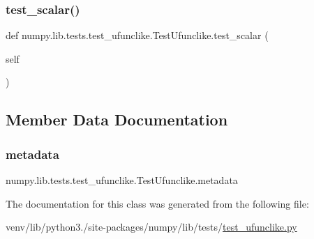 \subsubsection{\texorpdfstring{test\+\_\+scalar()}{test\_scalar()}}
{\footnotesize\ttfamily def numpy.\+lib.\+tests.\+test\+\_\+ufunclike.\+Test\+Ufunclike.\+test\+\_\+scalar (\begin{DoxyParamCaption}\item[{}]{self }\end{DoxyParamCaption})}



\subsection{Member Data Documentation}
\mbox{\label{classnumpy_1_1lib_1_1tests_1_1test__ufunclike_1_1TestUfunclike_a66ee5d6535c5a4e0c69b3c2cd7daddb8}} 
\subsubsection{\texorpdfstring{metadata}{metadata}}
{\footnotesize\ttfamily numpy.\+lib.\+tests.\+test\+\_\+ufunclike.\+Test\+Ufunclike.\+metadata}



The documentation for this class was generated from the following file\+:\begin{DoxyCompactItemize}
\item 
venv/lib/python3./site-\/packages/numpy/lib/tests/\hyperlink{test__ufunclike_8py}{test\+\_\+ufunclike.\+py}\end{DoxyCompactItemize}
